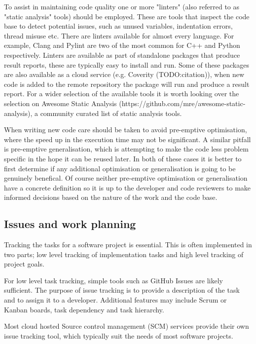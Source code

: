 \documentclass[jnr]{iosart2x}
\begin{document}
To assist in maintaining code quality one or more "linters" (also referred to as "static analysis" tools) should be employed.
These are tools that inspect the code base to detect potential issues, such as unused variables, indentation errors, thread misuse etc.
There are linters available for almost every language.
For example, Clang \cite{Clang} and Pylint \cite{Pylint} are two of the most common for C++ and Python respectively.
Linters are available as part of standalone packages that produce result reports, these are typically easy to install and run.
Some of these packages are also available as a cloud service (e.g. Coverity \cite{} (TODO:citation)), when new code is added to the remote repository the package will run and produce a result report. For a wider selection of the available tools it is worth looking over the selection on Awesome Static Analysis (https://github.com/mre/awesome-static-analysis), a community curated list of static analysis tools.

When writing new code care should be taken to avoid pre-emptive optimisation, where the speed up in the execution time may not be significant.
A similar pitfall is pre-emptive generalisation, which is attempting to make the code less problem specific in the hope it can be reused later. 
In both of these cases it is better to first determine if any additional optimisation or generalisation is going to be genuinely benefical. 
Of course neither pre-emptive optimisation or generalisation have a concrete definition so it is up to the developer and code reviewers to make informed decisions based on the nature of the work and the code base.

\subsection{Issues and work planning}
\label{Issues and work planning}

Tracking the tasks for a software project is essential.
This is often implemented in two parts; low level tracking of implementation tasks and high level tracking of project goals.

For low level task tracking, simple tools such as GitHub Issues are likely sufficient.
The purpose of issue tracking is to provide a description of the task and to assign it to a developer.
Additional features may include Scrum or Kanban boards, task dependency and task hierarchy.

Most cloud hosted Source control management (SCM) services provide their own issue tracking tool, which typically suit the needs of most software projects.
\end{document}
